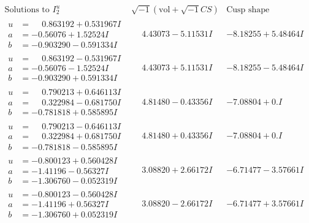\documentclass[1p]{elsarticle_modified}
\theoremstyle{definition}
\newcommand{\I}{\sqrt{-1}}
\begin{document}
$$\begin{array}{c|c|c}  
\text{Solutions to }I^u_{2}& \I (\text{vol} + \sqrt{-1}CS) & \text{Cusp shape}\\
 \hline 
\begin{aligned}
u &= \phantom{-}0.863192 + 0.531967 I \\
a &= -0.56076 + 1.52524 I \\
b &= -0.903290 - 0.591334 I\end{aligned}
 & \phantom{-}4.43073 - 5.11531 I & -8.18255 + 5.48464 I \\ \hline\begin{aligned}
u &= \phantom{-}0.863192 - 0.531967 I \\
a &= -0.56076 - 1.52524 I \\
b &= -0.903290 + 0.591334 I\end{aligned}
 & \phantom{-}4.43073 + 5.11531 I & -8.18255 - 5.48464 I \\ \hline\begin{aligned}
u &= \phantom{-}0.790213 + 0.646113 I \\
a &= \phantom{-}0.322984 - 0.681750 I \\
b &= -0.781818 + 0.585895 I\end{aligned}
 & \phantom{-}4.81480 - 0.43356 I & -7.08804 + 0. I\phantom{ +0.000000I} \\ \hline\begin{aligned}
u &= \phantom{-}0.790213 - 0.646113 I \\
a &= \phantom{-}0.322984 + 0.681750 I \\
b &= -0.781818 - 0.585895 I\end{aligned}
 & \phantom{-}4.81480 + 0.43356 I & -7.08804 + 0. I\phantom{ +0.000000I} \\ \hline\begin{aligned}
u &= -0.800123 + 0.560428 I \\
a &= -1.41196 - 0.56327 I \\
b &= -1.306760 - 0.052319 I\end{aligned}
 & \phantom{-}3.08820 + 2.66172 I & -6.71477 - 3.57661 I \\ \hline\begin{aligned}
u &= -0.800123 - 0.560428 I \\
a &= -1.41196 + 0.56327 I \\
b &= -1.306760 + 0.052319 I\end{aligned}
 & \phantom{-}3.08820 - 2.66172 I & -6.71477 + 3.57661 I \\ \hline\begin{aligned}

\end{aligned}
\end{array}$$
\end{document}
